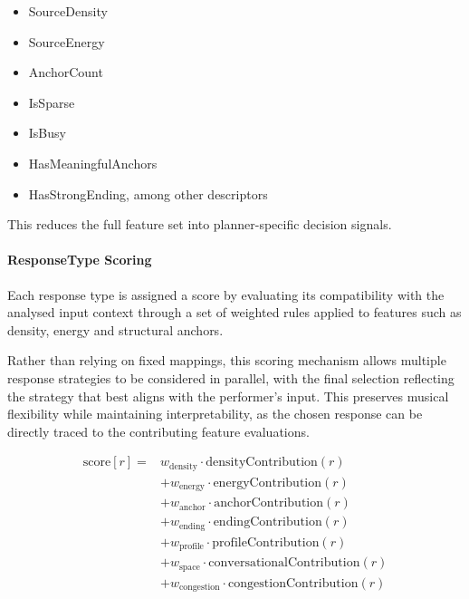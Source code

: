 \begin{itemize}
\item
  SourceDensity
\item
  SourceEnergy
\item
  AnchorCount
\end{itemize}

\begin{itemize}
\item
  IsSparse
\item
  IsBusy
\end{itemize}

\begin{itemize}
\item
  HasMeaningfulAnchors
\item
  HasStrongEnding, among other descriptors
\end{itemize}

This reduces the full feature set into planner-specific decision
signals.

\paragraph{ResponseType Scoring}\label{responsetype-scoring}

Each response type is assigned a score by evaluating its compatibility
with the analysed input context through a set of weighted rules applied
to features such as density, energy and structural anchors.

Rather than relying on fixed mappings, this scoring mechanism allows
multiple response strategies to be considered in parallel, with the
final selection reflecting the strategy that best aligns with the
performer's input. This preserves musical flexibility while maintaining
interpretability, as the chosen response can be directly traced to the
contributing feature evaluations.

\[
\begin{aligned}
\mathrm{score}[r] ={}& w_{\mathrm{density}} \cdot \mathrm{densityContribution}(r) \\
&+ w_{\mathrm{energy}} \cdot \mathrm{energyContribution}(r) \\
&+ w_{\mathrm{anchor}} \cdot \mathrm{anchorContribution}(r) \\
&+ w_{\mathrm{ending}} \cdot \mathrm{endingContribution}(r) \\
&+ w_{\mathrm{profile}} \cdot \mathrm{profileContribution}(r) \\
&+ w_{\mathrm{space}} \cdot \mathrm{conversationalContribution}(r) \\
&+ w_{\mathrm{congestion}} \cdot \mathrm{congestionContribution}(r)
\end{aligned}
\]

